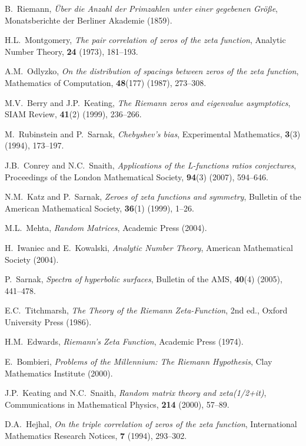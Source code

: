 \documentclass[12pt]{article}
\begin{document}
\begin{thebibliography}{99}

 B.~Riemann, \textit{Über die Anzahl der Primzahlen unter einer gegebenen Größe}, Monatsberichte der Berliner Akademie (1859).

 H.L.~Montgomery, \textit{The pair correlation of zeros of the zeta function}, Analytic Number Theory, \textbf{24} (1973), 181--193.

 A.M.~Odlyzko, \textit{On the distribution of spacings between zeros of the zeta function}, Mathematics of Computation, \textbf{48}(177) (1987), 273--308.

 M.V.~Berry and J.P.~Keating, \textit{The Riemann zeros and eigenvalue asymptotics}, SIAM Review, \textbf{41}(2) (1999), 236--266.

 M.~Rubinstein and P.~Sarnak, \textit{Chebyshev's bias}, Experimental Mathematics, \textbf{3}(3) (1994), 173--197.

 J.B.~Conrey and N.C.~Snaith, \textit{Applications of the L-functions ratios conjectures}, Proceedings of the London Mathematical Society, \textbf{94}(3) (2007), 594--646.

 N.M.~Katz and P.~Sarnak, \textit{Zeroes of zeta functions and symmetry}, Bulletin of the American Mathematical Society, \textbf{36}(1) (1999), 1--26.

 M.L.~Mehta, \textit{Random Matrices}, Academic Press (2004).

 H.~Iwaniec and E.~Kowalski, \textit{Analytic Number Theory}, American Mathematical Society (2004).

 P.~Sarnak, \textit{Spectra of hyperbolic surfaces}, Bulletin of the AMS, \textbf{40}(4) (2005), 441--478.

 E.C.~Titchmarsh, \textit{The Theory of the Riemann Zeta-Function}, 2nd ed., Oxford University Press (1986).

 H.M.~Edwards, \textit{Riemann's Zeta Function}, Academic Press (1974).

 E.~Bombieri, \textit{Problems of the Millennium: The Riemann Hypothesis}, Clay Mathematics Institute (2000).

 J.P.~Keating and N.C.~Snaith, \textit{Random matrix theory and zeta(1/2+it)}, Communications in Mathematical Physics, \textbf{214} (2000), 57--89.

 D.A.~Hejhal, \textit{On the triple correlation of zeros of the zeta function}, International Mathematics Research Notices, \textbf{7} (1994), 293--302.

\end{thebibliography}
\end{document}
